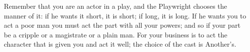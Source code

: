 Remember that you are an actor in a play, and the Playwright chooses the manner
of it: if he wants it short, it is  short; if long, it is long. If he wants you
to act a  poor man you must act the  part with all your powers; and  so if your
part be a cripple  or a magistrate or a plain man. For  your business is to act
the character  that is given  you and act  it well; the  choice of the  cast is
Another's.

